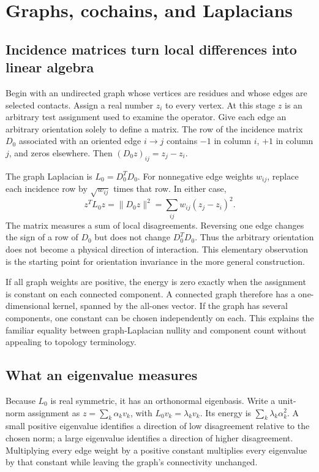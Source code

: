 \section{Graphs, cochains, and Laplacians}
\label{sec:foundations}
\subsection{Incidence matrices turn local differences into linear algebra}
Begin with an undirected graph whose vertices are residues and whose edges are selected contacts. Assign a real number $z_i$ to every vertex. At this stage $z$ is an arbitrary test assignment used to examine the operator. Give each edge an arbitrary orientation solely to define a matrix. The row of the incidence matrix $D_0$ associated with an oriented edge $i\to j$ contains $-1$ in column $i$, $+1$ in column $j$, and zeros elsewhere. Then $(D_0z)_{ij}=z_j-z_i$.

The graph Laplacian is $L_0=D_0^TD_0$. For nonnegative edge weights $w_{ij}$, replace each incidence row by $\sqrt{w_{ij}}$ times that row. In either case,
\begin{equation}
z^TL_0z=\|D_0z\|^2=\sum_{ij}w_{ij}(z_j-z_i)^2.
\label{eq:graph-tutorial-energy}
\end{equation}
The matrix measures a sum of local disagreements. Reversing one edge changes the sign of a row of $D_0$ but does not change $D_0^TD_0$. Thus the arbitrary orientation does not become a physical direction of interaction. This elementary observation is the starting point for orientation invariance in the more general construction.

If all graph weights are positive, the energy is zero exactly when the assignment is constant on each connected component. A connected graph therefore has a one-dimensional kernel, spanned by the all-ones vector. If the graph has several components, one constant can be chosen independently on each. This explains the familiar equality between graph-Laplacian nullity and component count without appealing to topology terminology.

\subsection{What an eigenvalue measures}
Because $L_0$ is real symmetric, it has an orthonormal eigenbasis. Write a unit-norm assignment as $z=\sum_k\alpha_kv_k$, with $L_0v_k=\lambda_kv_k$. Its energy is $\sum_k\lambda_k\alpha_k^2$. A small positive eigenvalue identifies a direction of low disagreement relative to the chosen norm; a large eigenvalue identifies a direction of higher disagreement. Multiplying every edge weight by a positive constant multiplies every eigenvalue by that constant while leaving the graph's connectivity unchanged.

